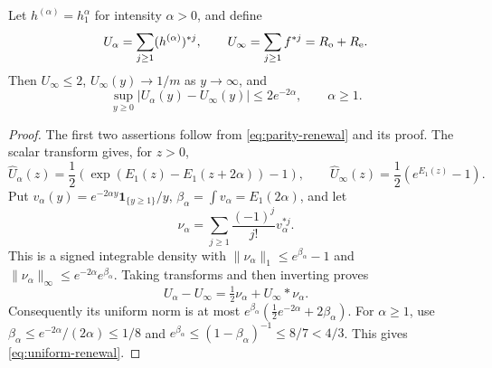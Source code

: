 \documentclass[11pt,letterpaper]{article}
\newcommand{\ind}{\mathbf 1}\newcommand{\Exp}{\operatorname{Exp}}
\begin{document}
\begin{lemma}
\label{lem:uniform-renewal}
Let $h^{(\alpha)}=h_1^\alpha$ for intensity $\alpha>0$, and define
\[
 U_\alpha=\sum_{j\ge1}(h^{(\alpha)})^{*j},\qquad
 U_\infty=\sum_{j\ge1}f^{*j}=R_{\rm o}+R_{\rm e}.
\]
Then $U_\infty\le2$, $U_\infty(y)\to1/m$ as $y\to\infty$, and
\begin{equation}\label{eq:uniform-renewal}
 \sup_{y\ge0}|U_\alpha(y)-U_\infty(y)|\le2e^{-2\alpha},
 \qquad \alpha\ge1.
\end{equation}
\end{lemma}
\begin{proof}
The first two assertions follow from \eqref{eq:parity-renewal} and its
proof. The scalar transform gives, for $z>0$,
\[
 \widehat U_\alpha(z)=\frac12
   \left(\exp(E_1(z)-E_1(z+2\alpha))-1\right),\qquad
 \widehat U_\infty(z)=\frac12(e^{E_1(z)}-1).
\]
Put $v_\alpha(y)=e^{-2\alpha y}\ind_{\{y\ge1\}}/y$,
$\beta_\alpha=\int v_\alpha=E_1(2\alpha)$, and let
\[
 \nu_\alpha=\sum_{j\ge1}\frac{(-1)^j}{j!}v_\alpha^{*j}.
\]
This is a signed integrable density with
$\|\nu_\alpha\|_1\le e^{\beta_\alpha}-1$ and
$\|\nu_\alpha\|_\infty\le e^{-2\alpha}e^{\beta_\alpha}$.
Taking transforms and then inverting proves
\[
 U_\alpha-U_\infty=\tfrac12\nu_\alpha+U_\infty*\nu_\alpha.
\]
Consequently its uniform norm is at most
$e^{\beta_\alpha}(\tfrac12e^{-2\alpha}+2\beta_\alpha)$.
For $\alpha\ge1$, use
$\beta_\alpha\le e^{-2\alpha}/(2\alpha)\le1/8$ and
$e^{\beta_\alpha}\le(1-\beta_\alpha)^{-1}\le8/7<4/3$.
This gives \eqref{eq:uniform-renewal}.
\end{proof}
\end{document}
